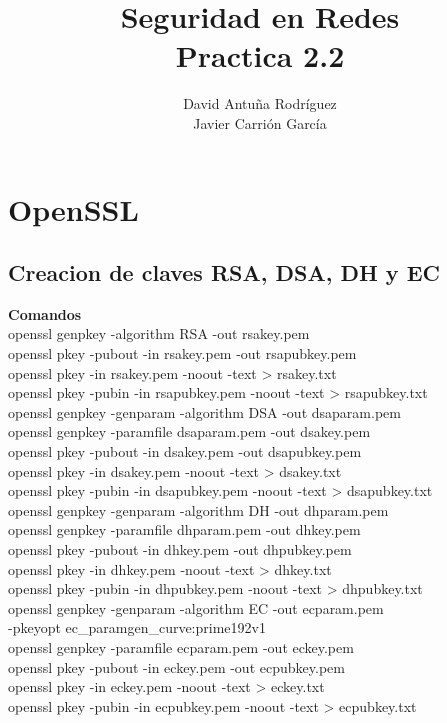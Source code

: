\documentclass[11pt]{article}
\title{\Large Seguridad en Redes\\Practica 2.2}
\author{David Antuña Rodríguez\\Javier Carrión García}
\date{}
\begin{document}
  \raggedright

  \maketitle
  \newpage

  \section{OpenSSL}
    \subsection{Creacion de claves RSA, DSA, DH y EC}
      \par
      \textbf{Comandos}\\
      openssl genpkey -algorithm RSA -out rsakey.pem\\
      openssl pkey -pubout -in rsakey.pem -out rsapubkey.pem\\
      openssl pkey -in rsakey.pem -noout -text > rsakey.txt\\
      openssl pkey -pubin -in rsapubkey.pem -noout -text > rsapubkey.txt\\
      \vspace{2mm}
      openssl genpkey -genparam -algorithm DSA -out dsaparam.pem\\
      openssl genpkey -paramfile dsaparam.pem -out dsakey.pem\\
      openssl pkey -pubout -in dsakey.pem -out dsapubkey.pem\\
      openssl pkey -in dsakey.pem -noout -text > dsakey.txt\\
      openssl pkey -pubin -in dsapubkey.pem -noout -text > dsapubkey.txt\\
      \vspace{2mm}
      openssl genpkey -genparam -algorithm DH -out dhparam.pem\\
      openssl genpkey -paramfile dhparam.pem -out dhkey.pem\\
      openssl pkey -pubout -in dhkey.pem -out dhpubkey.pem\\
      openssl pkey -in dhkey.pem -noout -text > dhkey.txt\\
      openssl pkey -pubin -in dhpubkey.pem -noout -text > dhpubkey.txt\\
      \vspace{2mm}
      openssl genpkey -genparam -algorithm EC -out ecparam.pem\\
        \hspace{4mm}-pkeyopt ec\_paramgen\_curve:prime192v1\\
      openssl genpkey -paramfile ecparam.pem -out eckey.pem\\
      openssl pkey -pubout -in eckey.pem -out ecpubkey.pem\\
      openssl pkey -in eckey.pem -noout -text > eckey.txt\\
      openssl pkey -pubin -in ecpubkey.pem -noout -text > ecpubkey.txt
\end{document}
